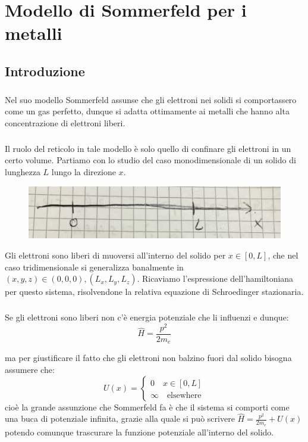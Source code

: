 \documentclass{book}
\begin{document}
\chapter{Modello di Sommerfeld per i metalli}
    \section{Introduzione}
        \paragraph{}
            Nel suo modello Sommerfeld assunse che gli elettroni nei solidi si comportassero come un gas perfetto, dunque si adatta ottimamente ai metalli che hanno alta concentrazione di elettroni liberi.
        \paragraph{}
            Il ruolo del reticolo in tale modello è solo quello di confinare gli elettroni in un certo volume. Partiamo con lo studio del caso monodimensionale di un solido di lunghezza $L$ lungo la direzione $x$.
            \begin{figure}[h!]
                \centering
                \includegraphics[width=0.5\linewidth]{img/direzioneLungoExLez12.png}
            \end{figure}
            Gli elettroni sono liberi di muoversi all'interno del solido per $x \in [0,L]$, che nel caso tridimensionale si generalizza banalmente in $(x,y,z) \in (0,0,0),(L_{x}, L_{y}, L_{z})$. Ricaviamo l'espressione dell'hamiltoniana  per questo sistema, risolvendone la relativa equazione di Schroedinger stazionaria.
        \paragraph{}
            Se gli elettroni sono liberi non c'è energia potenziale che li influenzi e dunque:
            $$\hat{H} = \frac{p^{2}}{2m_{e}}$$

            ma per giustificare il fatto che gli elettroni non balzino fuori dal solido bisogna assumere che:
            $$U(x) =\begin{cases}
                0 \quad x \in [0, L] \\
                \infty \quad \textrm{elsewhere}
            \end{cases}$$
            cioè la grande assunzione che Sommerfeld fa è che il sistema si comporti come una buca di potenziale infinita, grazie alla quale si può scrivere $\hat{H} = \frac{p^{2}}{2m_{e}}+ U(x)$ potendo comunque trascurare la funzione potenziale all'interno del solido.
\end{document}
